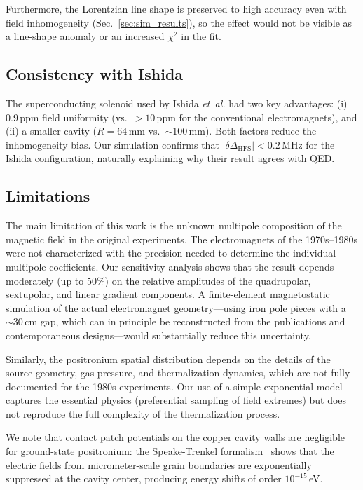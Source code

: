 \documentclass[twocolumn,pra,aps,superscriptaddress,floatfix,10pt]{revtex4-2}
\begin{document}
Furthermore, the Lorentzian line shape is preserved to high accuracy even with field inhomogeneity (Sec.~\ref{sec:sim_results}), so the effect would not be visible as a line-shape anomaly or an increased $\chi^2$ in the fit.

\subsection{Consistency with Ishida}

The superconducting solenoid used by Ishida \textit{et~al.} had two key advantages: (i) 0.9\,ppm field uniformity (vs.\ $>10$\,ppm for the conventional electromagnets), and (ii) a smaller cavity ($R = 64$\,mm vs.\ $\sim 100$\,mm). Both factors reduce the inhomogeneity bias. Our simulation confirms that $|\delta\Delta_\mathrm{HFS}| < 0.2$\,MHz for the Ishida configuration, naturally explaining why their result agrees with QED.

\subsection{Limitations}

The main limitation of this work is the unknown multipole composition of the magnetic field in the original experiments. The electromagnets of the 1970s--1980s were not characterized with the precision needed to determine the individual multipole coefficients. Our sensitivity analysis shows that the result depends moderately (up to 50\%) on the relative amplitudes of the quadrupolar, sextupolar, and linear gradient components. A finite-element magnetostatic simulation of the actual electromagnet geometry---using iron pole pieces with a $\sim 30$\,cm gap, which can in principle be reconstructed from the publications and contemporaneous designs---would substantially reduce this uncertainty.

Similarly, the positronium spatial distribution depends on the details of the source geometry, gas pressure, and thermalization dynamics, which are not fully documented for the 1980s experiments. Our use of a simple exponential model captures the essential physics (preferential sampling of field extremes) but does not reproduce the full complexity of the thermalization process.

We note that contact patch potentials on the copper cavity walls are negligible for ground-state positronium: the Speake-Trenkel formalism~\cite{Speake2003} shows that the electric fields from micrometer-scale grain boundaries are exponentially suppressed at the cavity center, producing energy shifts of order $10^{-15}$\,eV.
\end{document}
